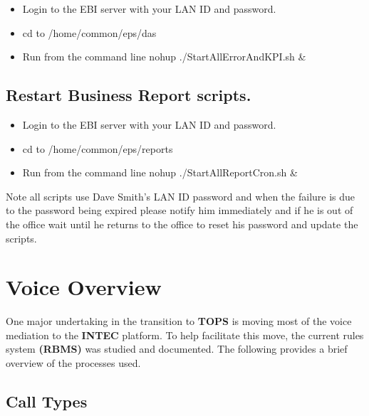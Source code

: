 \documentclass[12pt,twoside]{article}
\begin{document}
\begin{itemize}
\item Login to the EBI server with your LAN ID and password.
\item cd to /home/common/eps/das
\item Run from the command line nohup ./StartAllErrorAndKPI.sh \&
\end{itemize}
 
\subsection{Restart Business Report scripts.}
\label{sec-4-9}

\begin{itemize}
\item Login to the EBI server with your LAN ID and password.
\item cd to /home/common/eps/reports
\item Run from the command line nohup ./StartAllReportCron.sh \&
\end{itemize}
 
   Note all scripts use Dave Smith's LAN ID password and when the failure is due to the password being expired please notify him immediately and if he is out of the office wait until he returns to the office to reset his password and update the scripts.
\section{Voice Overview}
\label{sec-5}

\normalsize
  One major undertaking in the transition to \textbf{TOPS} is moving most of
  the voice mediation to the \textbf{INTEC} platform. To help facilitate this
  move, the current rules system \textbf{(RBMS)} was studied and
  documented. The following provides a brief overview of the processes
  used. 
\subsection{Call Types}
\label{sec-5-1}
\end{document}
